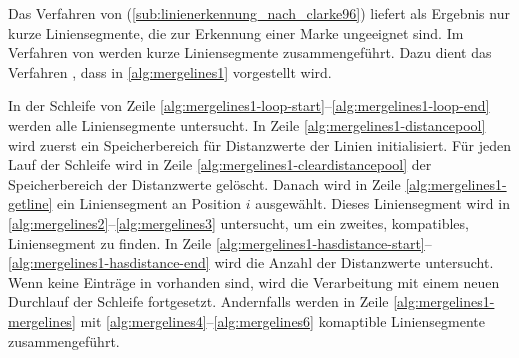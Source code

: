 
Das Verfahren von \citeauthor{clarke96} (\autoref{sub:linienerkennung_nach_clarke96}) liefert als Ergebnis nur kurze
 Liniensegmente, die zur Erkennung einer Marke ungeeignet sind. Im Verfahren von \citeauthor{hirzer08} werden kurze
 Liniensegmente zusammengeführt. Dazu dient das Verfahren , dass in \autoref{alg:mergelines1}
 vorgestellt wird.

In der Schleife von Zeile \ref{alg:mergelines1-loop-start}--\ref{alg:mergelines1-loop-end} werden alle Liniensegmente
 untersucht. In Zeile \ref{alg:mergelines1-distancepool} wird zuerst ein Speicherbereich für Distanzwerte der Linien
 initialisiert. Für jeden Lauf der Schleife wird in Zeile \ref{alg:mergelines1-cleardistancepool} der Speicherbereich
 der Distanzwerte gelöscht. Danach wird in Zeile \ref{alg:mergelines1-getline} ein Liniensegment an Position $i$
 ausgewählt. Dieses Liniensegment wird in \autoref{alg:mergelines2}--\autoref{alg:mergelines3} untersucht, um ein
 zweites, kompatibles, Liniensegment zu finden. In Zeile
 \ref{alg:mergelines1-hasdistance-start}--\ref{alg:mergelines1-hasdistance-end} wird die Anzahl der Distanzwerte
 untersucht. Wenn keine Einträge in  vorhanden sind, wird die Verarbeitung mit einem neuen
 Durchlauf der Schleife fortgesetzt. Andernfalls werden in Zeile \ref{alg:mergelines1-mergelines} mit
 \autoref{alg:mergelines4}--\autoref{alg:mergelines6} komaptible Liniensegmente zusammengeführt.

